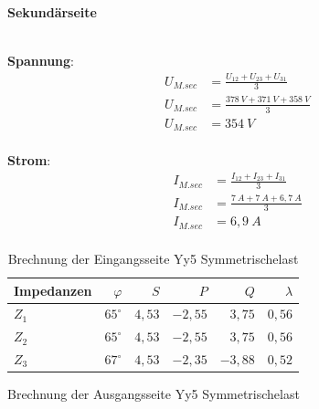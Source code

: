 \begin{enumerate}[label=\alph*)]
	      \textbf{Sekundärseite}\\ \ \\

	      \begin{tcolorbox}[colback=gray!30,
			      colframe=black,
			      width=0.9\textwidth,
		      ]
		      \parbox{\textwidth}{

			      \begin{minipage}{0.5\textwidth}
				      \textbf{Spannung}:
				      \begin{align*}
					      U_{M.sec} & = \frac{U_{12} + U_{23} + U_{31}}{3} \\
					      U_{M.sec} & = \frac{378\ V + 371\ V + 358\ V}{3} \\
					      U_{M.sec} & = 354\ V                             \\
				      \end{align*}
			      \end{minipage}\hfill
			      \begin{minipage}{0.5\textwidth}
				      \textbf{Strom}:
				      \begin{align*}
					      I_{M.sec} & = \frac{I_{12} + I_{23} + I_{31}}{3} \\
					      I_{M.sec} & = \frac{7\ A + 7\ A + 6,7\ A}{3}     \\
					      I_{M.sec} & = 6,9\ A                             \\
				      \end{align*}
			      \end{minipage}
		      }
	      \end{tcolorbox}
	      \begin{table}[h!]
		      \caption{Brechnung der Eingangsseite Yy5 Symmetrischelast}
		      \centering
		      \begin{tabular}{lrrrrr}
			      \hline
			      Impedanzen & $\varphi$    & $S$    & $P$      & $Q$      & $\lambda$ \\ \hline
			      $Z_1$      & $65^\circ$   & $4,53$ & $-2,55$  & $ 3,75 $ & $0,56$    \\
			      $Z_2$      & $65^\circ$   & $4,53$ & $-2,55 $ & $ 3,75$  & $0,56$    \\
			      $Z_3$      & $67^\circ  $ & $4,53$ & $-2,35$  & $ -3,88$ & $0,52$    \\ \hline
		      \end{tabular}
	      \end{table}
	      \begin{table}[h!]
		      \caption{Brechnung der Ausgangsseite Yy5 Symmetrischelast}

\end{table}
\end{enumerate}
